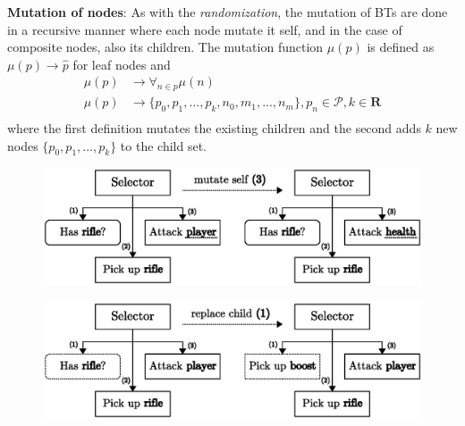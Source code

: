 \documentclass[a4paper, twocolumn]{article}
\begin{document}
        \textbf{Mutation of nodes}: As with the \textit{randomization}, the mutation of BTs are done in a recursive manner where each node mutate it self, and in the case of composite nodes, also its children. The mutation function \(\mu(p)\) is defined as \(\mu(p) \rightarrow \hat{p}\) for leaf nodes and 
        \begin{align*}
            \mu(p) &\rightarrow \forall_{n \in p}{\mu(n)} \\
            \mu(p) &\rightarrow \{p_0,p_1,...,p_k,n_0,m_1,...,n_m\}, p_n \in \mathcal{P}, k \in \mathbf{R} \\
        \end{align*}
        where the first definition mutates the existing children and the second adds \(k\) new nodes \(\{p_0,p_1,...,p_k\}\) to the child set.

        \begin{figure}[H]
            \centering
            \includegraphics[width=\linewidth]{share/leaf_mutation.eps}
            \caption{}
            \label{fig:leaf_mutation}
        \end{figure}

        \begin{figure}[H]
            \centering
            \includegraphics[width=\linewidth]{share/child_replacement.eps}
            \caption{}
            \label{fig:child_replacement}
        \end{figure}
\end{document}
